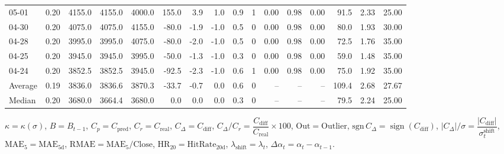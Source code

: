 \begin{threeparttable}
{\begin{tabular}{lrrrrrrrrrrrrrrr}
  05-01 &     0.20 & 4155.0 & 4155.0 & 4000.0 &      155.0 &            3.9 &                      1.0 &                 0.9 &              1 &       0.00 &      0.98 &           0.00 &             91.5 &            2.33 &                  25.00 \\
  04-30 &     0.20 & 4075.0 & 4075.0 & 4155.0 &      -80.0 &           -1.9 &                     -1.0 &                 0.5 &              0 &       0.00 &      0.98 &           0.00 &             80.0 &            1.93 &                  30.00 \\
  04-28 &     0.20 & 3995.0 & 3995.0 & 4075.0 &      -80.0 &           -2.0 &                     -1.0 &                 0.5 &              0 &       0.00 &      0.98 &           0.00 &             72.5 &            1.76 &                  35.00 \\
  04-25 &     0.20 & 3945.0 & 3945.0 & 3995.0 &      -50.0 &           -1.3 &                     -1.0 &                 0.3 &              0 &       0.00 &      0.98 &           0.00 &             59.0 &            1.48 &                  35.00 \\
  04-24 &     0.20 & 3852.5 & 3852.5 & 3945.0 &      -92.5 &           -2.3 &                     -1.0 &                 0.6 &              1 &       0.00 &      0.98 &           0.00 &             75.0 &            1.92 &                  35.00 \\
Average &     0.19 & 3836.0 & 3836.6 & 3870.3 &      -33.7 &           -0.7 &                      0.0 &                 0.6 &              0 &         -- &        -- &             -- &            109.4 &            2.68 &                  27.67 \\
 Median &     0.20 & 3680.0 & 3664.4 & 3680.0 &        0.0 &            0.0 &                      0.0 &                 0.3 &              0 &         -- &        -- &             -- &             79.5 &            2.24 &                  25.00 \\
\bottomrule
\end{tabular}
}
\begin{tablenotes}\footnotesize
\item $\kappa=\kappa(\sigma)$, $B=B_{t-1}$, $C_p=C_{\text{pred}}$, $C_r=C_{\text{real}}$, $C_\Delta=C_{\text{diff}}$, $C_\Delta/C_r=\dfrac{C_{\text{diff}}}{C_{\text{real}}}\times100$, $\mathrm{Out}=\text{Outlier}$, $\mathrm{sgn}\,C_\Delta=\operatorname{sign}(C_{\text{diff}})$, $|C_\Delta|/\sigma=\dfrac{|C_{\text{diff}}|}{\sigma_t^{\text{shift}}}$, $\mathrm{MAE}_5=\mathrm{MAE}_{5\text{d}}$, $\mathrm{RMAE}= \mathrm{MAE}_5 / \text{Close}$, $\mathrm{HR}_{20}=\mathrm{HitRate}_{20\text{d}}$, 
$\lambda_{\text{shift}}=\lambda_t$, 
$\Delta\alpha_t=\alpha_t-\alpha_{t-1}$.
\end{tablenotes}
\end{threeparttable}
\endgroup

